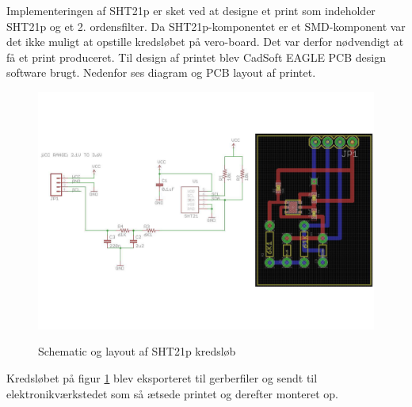 Implementeringen af SHT21p er sket ved at designe et print som indeholder SHT21p og et 2. ordensfilter. 
Da SHT21p-komponentet er et SMD-komponent var det ikke muligt at opstille kredsløbet på vero-board. Det var derfor nødvendigt at få et print produceret. Til design af printet blev CadSoft EAGLE PCB design software brugt. Nedenfor ses diagram og PCB layout af printet.


\begin{figure}[htb]
\centering
{\includegraphics[width=\textwidth]{filer/implementering/SHT_pcb}}
\caption{Schematic og layout af SHT21p kredsl\o{}b}
\label{lab:SHT21p-kredsloeb}
\end{figure}

Kredsløbet på figur \ref{lab:SHT21p-kredsloeb} blev eksporteret til gerberfiler og sendt til elektronikværkstedet som så ætsede printet og derefter monteret op.

